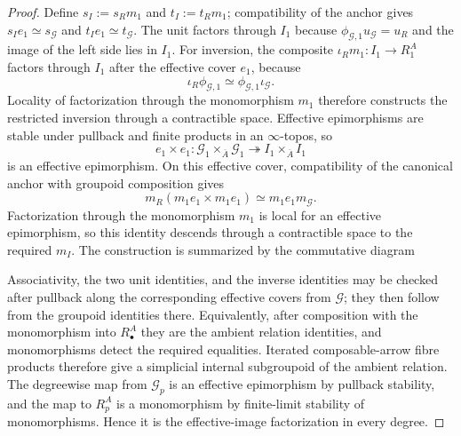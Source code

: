 \begin{proof}
Define $s_I:=s_Rm_1$ and $t_I:=t_Rm_1$; compatibility of the anchor gives
$s_Ie_1\simeq s_{\mathcal G}$ and $t_Ie_1\simeq t_{\mathcal G}$.  The unit
factors through $I_1$ because $\phi_{\mathcal G,1}u_{\mathcal G}=u_R$ and the
image of the left side lies in $I_1$.  For inversion, the composite
$\iota_Rm_1:I_1\to R^A_1$ factors through $I_1$ after the effective cover $e_1$,
because
\[
\iota_R\phi_{\mathcal G,1}
\simeq
\phi_{\mathcal G,1}\iota_{\mathcal G}.
\]
Locality of factorization through the monomorphism $m_1$ therefore constructs the
restricted inversion through a contractible space.  Effective epimorphisms are
stable under pullback and finite products in an
$\infty$-topos, so
\[
e_1\times e_1:
\mathcal G_1\times_{\overline A}\mathcal G_1
\twoheadrightarrow
I_1\times_{\overline A}I_1
\]
is an effective epimorphism.  On this effective cover, compatibility of the
canonical anchor with groupoid composition gives
\[
m_R(m_1e_1\times m_1e_1)
\simeq
m_1e_1m_{\mathcal G}.
\]
Factorization through the monomorphism $m_1$ is local for an effective
epimorphism, so this identity descends through a contractible space to the required
$m_I$.  The construction is summarized by the commutative diagram
Associativity, the two unit identities, and the inverse identities may be checked
after pullback along the corresponding effective covers from $\mathcal G$; they
then follow from the groupoid identities there.  Equivalently, after composition
with the monomorphism into $R^A_\bullet$ they are the ambient relation identities,
and monomorphisms detect the required equalities.  Iterated composable-arrow fibre
products therefore give a simplicial internal subgroupoid of the ambient relation.  The degreewise map
from $\mathcal G_p$ is an effective epimorphism by pullback stability, and the map
to $R^A_p$ is a monomorphism by finite-limit stability of monomorphisms.  Hence it
is the effective-image factorization in every degree.
\end{proof}

